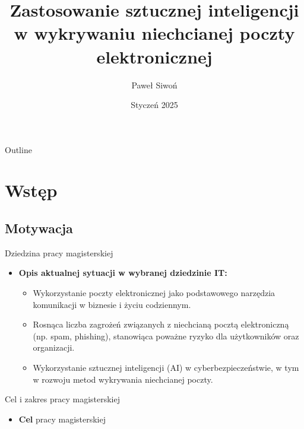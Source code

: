 \documentclass[12]{beamer}
\title[Zastosowanie sztucznej inteligencji w wykrywaniu niechcianej poczty elektronicznej]
{Zastosowanie sztucznej inteligencji w wykrywaniu niechcianej poczty elektronicznej}
\author{Paweł Siwoń} %
\institute[ICS, TUL]{dr hab. inż. Tomasz Hyla, - prof. ZUT} %
\date{Styczeń 2025}
\begin{document}
\begin{frame}
  \titlepage
\end{frame}

\begin{frame}{Outline}
  \tableofcontents
\end{frame}

\section{Wstęp}

\subsection{Motywacja}

\begin{frame}{Dziedzina pracy magisterskiej}
\normalsize{
  \begin{itemize}
  \item
    \textbf{Opis aktualnej sytuacji w wybranej dziedzinie IT:}
    \begin{itemize}
        \item Wykorzystanie poczty elektronicznej jako podstawowego narzędzia komunikacji w biznesie i życiu codziennym.
        \item Rosnąca liczba zagrożeń związanych z niechcianą pocztą elektroniczną (np. spam, phishing), stanowiąca poważne ryzyko dla użytkowników oraz organizacji.
        \item Wykorzystanie sztucznej inteligencji (AI) w cyberbezpieczeństwie, w tym w rozwoju metod wykrywania niechcianej poczty.
    \end{itemize}
  \end{itemize}
}
\end{frame}

\begin{frame}{Cel i zakres pracy magisterskiej}
\normalsize{
  \begin{itemize}
  \item
    \textbf{Cel} pracy magisterskiej
  \end{itemize}
}
\end{frame}
\end{document}
